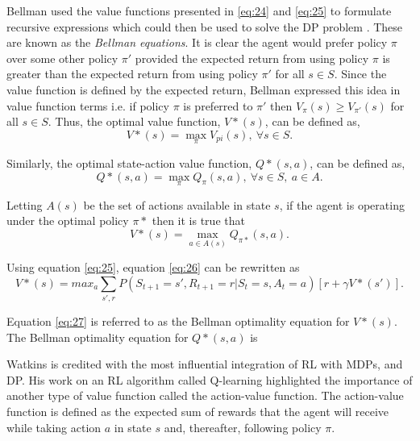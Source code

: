 Bellman used the value functions presented in \ref{eq:24} and \ref{eq:25} to formulate recursive expressions which could then be used to solve the DP problem \cite{Bellm1957}. These are known as the \textit{Bellman equations}. It is clear the agent would prefer policy $\pi$ over some other policy $\pi'$ provided the expected return from using policy $\pi$ is greater than the expected return from using policy $\pi'$ for all $s \in S$. Since the value function is defined by the expected return, Bellman expressed this idea in value function terms i.e. if policy $\pi$ is preferred to $\pi'$ then $V_{\pi}(s) \geq V_{\pi'}(s)$ for all $s \in S$. Thus, the optimal value function, $V*(s)$, can be defined as,
\begin{equation}
	V*(s) = \max_{\pi} V_{pi}(s), \ \forall s \in S.
\end{equation}

Similarly, the optimal state-action value function, $Q*(s,a)$, can be defined as,
\begin{equation}
	Q*(s,a) = \max_{\pi} Q_{\pi}(s,a), \ \forall s \in S, \ a \in A.
\end{equation}

Letting $A(s)$ be the set of actions available in state $s$, if the agent is operating under the optimal policy $\pi*$ then it is true that
\begin{equation}
	V*(s) = \max_{a \in A(s)} Q_{\pi*}(s,a). \label{eq:26}
\end{equation}

Using equation \ref{eq:25}, equation \ref{eq:26} can be rewritten as
\begin{equation}
	V*(s) = max_{a} \sum_{s',r}P(S_{t+1} = s', R_{t+1} = r | S_t = s, A_t = a)[r + \gamma V*(s')]. \label{eq:27}
\end{equation}  

Equation \ref{eq:27} is referred to as the Bellman optimality equation for $V*(s)$. The Bellman optimality equation for $Q*(s,a)$ is
\begin{equation}
\end{equation}

Watkins is credited with the most influential integration of RL with MDPs, and DP. His work on an RL algorithm called Q-learning highlighted the importance of another type of value function called the action-value function. The action-value function is defined as the expected sum of rewards that the agent will receive while taking action $a$ in state $s$ and, thereafter, following policy $\pi$.






